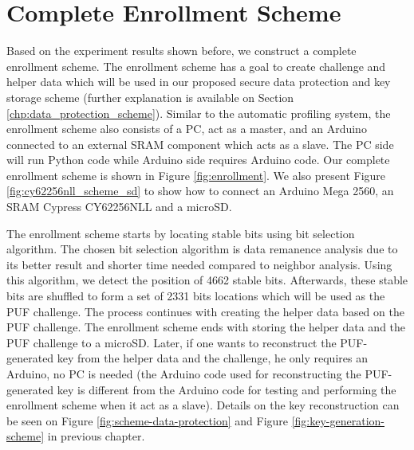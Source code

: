 \section{Complete Enrollment Scheme}\label{ch:complete_enrollment_scheme}
Based on the experiment results shown before, we construct a complete enrollment scheme. The enrollment scheme has a goal to create challenge and helper data which will be used in our proposed secure data protection and key storage scheme (further explanation is available on Section \ref{chp:data_protection_scheme}).
Similar to the automatic profiling system, the enrollment scheme also consists of a PC, act as a master, and an Arduino connected to an external SRAM component which acts as a slave. The PC side will run Python code while Arduino side requires Arduino code.
Our complete enrollment scheme is shown in Figure \ref{fig:enrollment}. We also present Figure \ref{fig:cy62256nll_scheme_sd} to show how to connect an Arduino Mega 2560, an SRAM Cypress CY62256NLL and a microSD.

The enrollment scheme starts by locating stable bits using bit selection algorithm. The chosen bit selection algorithm is data remanence analysis due to its better result and shorter time needed compared to neighbor analysis. Using this algorithm, we detect the position of 4662 stable bits. Afterwards, these stable bits are shuffled to form a set of 2331 bits locations which will be used as the PUF challenge. The process continues with creating the helper data based on the PUF challenge. The enrollment scheme ends with storing the helper data and the PUF challenge to a microSD. Later, if one wants to reconstruct the PUF-generated key from the helper data and the challenge, he only requires an Arduino, no PC is needed (the Arduino code used for reconstructing the PUF-generated key is different from the Arduino code for testing and performing the enrollment scheme when it act as a slave). Details on the key reconstruction can be seen on Figure \ref{fig:scheme-data-protection} and Figure \ref{fig:key-generation-scheme} in previous chapter.

